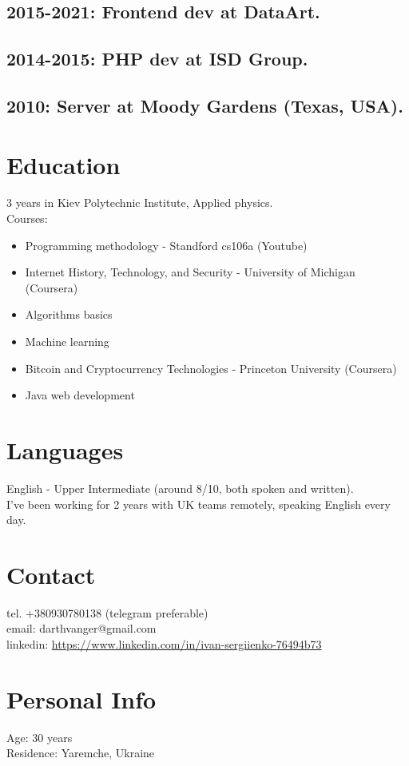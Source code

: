 \documentclass[a4paper, 14pt]{article}
\begin{document}
  \subsection{2015-2021: Frontend dev at DataArt.}
	\subsection{2014-2015: PHP dev at ISD Group.}
  \subsection{2010: Server at Moody Gardens (Texas, USA).}

\section{Education}
	3 years in Kiev Polytechnic Institute, Applied physics. \\
  Courses:
  \begin{itemize}
    \item Programming methodology - Standford cs106a (Youtube) \\
    \item Internet History, Technology, and Security - University of Michigan (Coursera) \\
    \item Algorithms basics \\
    \item Machine learning \\
    \item Bitcoin and Cryptocurrency Technologies - Princeton University (Coursera) \\
    \item Java web development
  \end{itemize}

\section{Languages}
	English - Upper Intermediate (around 8/10, both spoken and written). \\
  I've been working for 2 years with UK teams remotely, speaking English every day.

\section{Contact}
	tel. +380930780138 (telegram preferable) \\
	email: darthvanger@gmail.com \\
  linkedin: \url{https://www.linkedin.com/in/ivan-sergiienko-76494b73} \\

\section{Personal Info}
	Age: 30 years \\
  Residence: Yaremche, Ukraine
\end{document}
